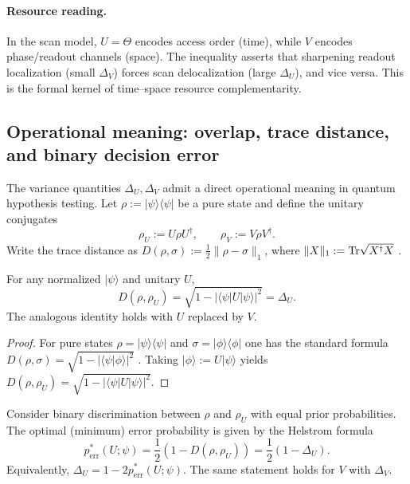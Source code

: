 \paragraph{Resource reading.}
In the scan model, $U=\Theta$ encodes access order (time), while $V$ encodes phase/readout channels (space).
The inequality asserts that sharpening readout localization (small $\Delta_V$) forces scan delocalization (large $\Delta_U$), and vice versa.
This is the formal kernel of time--space resource complementarity.

\subsection{Operational meaning: overlap, trace distance, and binary decision error}
\label{app:weyl_operational}
The variance quantities $\Delta_U,\Delta_V$ admit a direct operational meaning in quantum hypothesis testing.
Let $\rho:=|\psi\rangle\langle\psi|$ be a pure state and define the unitary conjugates
\begin{equation}
\rho_U:=U\rho U^{\dagger},\qquad \rho_V:=V\rho V^{\dagger}.
\end{equation}
Write the trace distance as $D(\rho,\sigma):=\tfrac12\|\rho-\sigma\|_1$, where $\|X\|_1:=\mathrm{Tr}\sqrt{X^{\dagger}X}$ \cite{Watrous2018}.

\begin{lemma}
\label{lem:variance_trace_distance}
For any normalized $|\psi\rangle$ and unitary $U$,
\begin{equation}
D(\rho,\rho_U)=\sqrt{1-\bigl|\langle\psi|U|\psi\rangle\bigr|^2}=\Delta_U.
\end{equation}
The analogous identity holds with $U$ replaced by $V$.
\end{lemma}

\begin{proof}
For pure states $\rho=|\psi\rangle\langle\psi|$ and $\sigma=|\phi\rangle\langle\phi|$ one has the standard formula
$D(\rho,\sigma)=\sqrt{1-|\langle\psi|\phi\rangle|^2}$ \cite{Watrous2018}.
Taking $|\phi\rangle:=U|\psi\rangle$ yields $D(\rho,\rho_U)=\sqrt{1-|\langle\psi|U|\psi\rangle|^2}$.
\end{proof}

\begin{corollary}
\label{cor:helstrom_error_unitary_kick}
Consider binary discrimination between $\rho$ and $\rho_U$ with equal prior probabilities.
The optimal (minimum) error probability is given by the Helstrom formula \cite{Helstrom1976,Watrous2018}
\begin{equation}
p_{\mathrm{err}}^{*}(U;\psi)=\frac12\left(1-D(\rho,\rho_U)\right)=\frac12\left(1-\Delta_U\right).
\label{eq:helstrom_error_deltaU}
\end{equation}
Equivalently, $\Delta_U=1-2p_{\mathrm{err}}^{*}(U;\psi)$.
The same statement holds for $V$ with $\Delta_V$.
\end{corollary}

